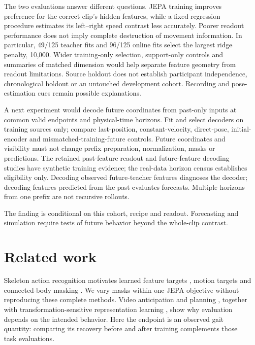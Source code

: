 \documentclass{article}
\begin{document}
The two evaluations answer different questions. JEPA training improves
preference for the correct clip's hidden features, while a fixed
regression procedure estimates its left--right speed contrast less
accurately. Poorer readout performance does not imply complete
destruction of movement information. In particular, 49/125 teacher fits
and 96/125 online fits select the largest ridge penalty, 10,000. Wider
training-only selection, support-only controls and summaries of matched
dimension would help separate feature geometry from readout limitations.
Source holdout does not establish participant independence,
chronological holdout or an untouched development cohort. Recording and
pose-estimation cues remain possible explanations.

A next experiment would decode future coordinates from past-only inputs
at common valid endpoints and physical-time horizons. Fit and select
decoders on training sources only; compare last-position,
constant-velocity, direct-pose, initial-encoder and
mismatched-training-future controls. Future coordinates and visibility
must not change prefix preparation, normalization, masks or predictions.
The retained past-feature readout and future-feature decoding studies
have synthetic training evidence; the real-data horizon census
establishes eligibility only. Decoding observed future-teacher features
diagnoses the decoder; decoding features predicted from the past
evaluates forecasts. Multiple horizons from one prefix are not recursive
rollouts.

The finding is conditional on this cohort, recipe and readout.
Forecasting and simulation require tests of future behavior beyond the
whole-clip contrast.

\section{Related work}\label{related-work}

Skeleton action recognition motivates learned feature targets
\citep{sjepa}, motion targets \citep{mamp} and connected-body masking
\citep{slim}. We vary masks within one JEPA objective without
reproducing these complete methods. Video anticipation and planning
\citep{vjepa2}, together with transformation-sensitive representation
learning \citep{seqjepa}, show why evaluation depends on the intended
behavior. Here the endpoint is an observed gait quantity: comparing its
recovery before and after training complements those task evaluations.

\clearpage


\clearpage
\appendix
\end{document}
